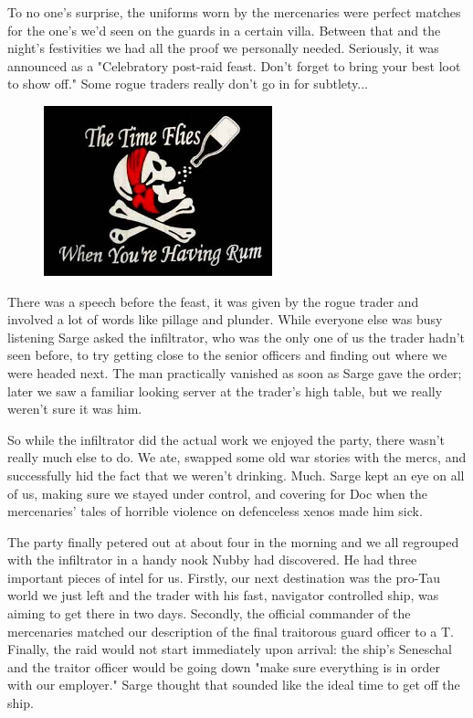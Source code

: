 To no one's surprise, the uniforms worn by the mercenaries were perfect matches for the one's we'd seen on the guards in a certain villa. 
Between that and the night's festivities we had all the proof we personally needed. 
Seriously, it was announced as a "Celebratory post-raid feast. 
Don't forget to bring your best loot to show off."  Some rogue traders really don't go in for subtlety...

\begin{figure}
	\begin{center}
		\includegraphics[width=\figwidth]{pics/10/58.png}
	\end{center}
\end{figure}
There was a speech before the feast, it was given by the rogue trader and involved a lot of words like pillage and plunder. 
While everyone else was busy listening Sarge asked the infiltrator, who was the only one of us the trader hadn't seen before, to try getting close to the senior officers and finding out where we were headed next. 
The man practically vanished as soon as Sarge gave the order; 
later we saw a familiar looking server at the trader's high table, but we really weren't sure it was him.

So while the infiltrator did the actual work we enjoyed the party, there wasn't really much else to do. 
We ate, swapped some old war stories with the mercs, and successfully hid the fact that we weren't drinking. 
Much.
Sarge kept an eye on all of us, making sure we stayed under control, and covering for Doc when the mercenaries' tales of horrible violence on defenceless xenos made him sick. 


The party finally petered out at about four in the morning and we all regrouped with the infiltrator in a handy nook Nubby had discovered. 
He had three important pieces of intel for us. 
Firstly, our next destination was the pro-Tau world we just left and the trader with his fast, navigator controlled ship, was aiming to get there in two days. 
Secondly, the official commander of the mercenaries matched our description of the final traitorous guard officer to a T. 
Finally, the raid would not start immediately upon arrival: 
the ship's Seneschal and the traitor officer would be going down "make sure everything is in order with our employer." Sarge thought that sounded like the ideal time to get off the ship.

